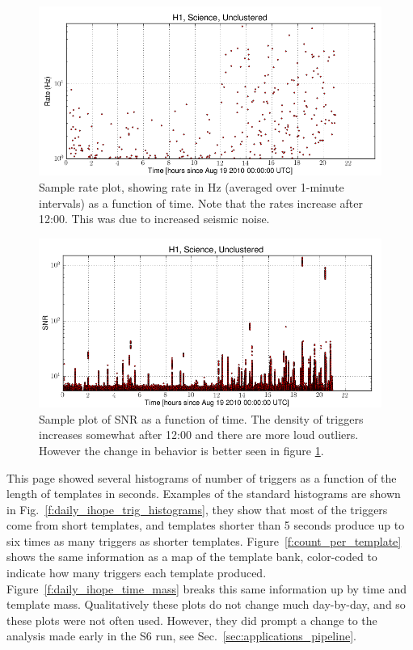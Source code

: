 \begin{figure}
  \includegraphics[width=\linewidth]{figures/detchar/H1_0_UNCLUSTERED_rate_vs_time.png}
  \caption[Daily ihope rate plot]{
  \label{f:daily_ihope_rate_v_time}
Sample rate plot, showing rate in Hz (averaged over
1-minute intervals) as a function of time.  Note that the rates
increase after 12:00.  This was due to increased seismic noise.}
\end{figure}%

\begin{figure}
  \includegraphics[width=\linewidth]{figures/detchar/H1_0_UNCLUSTERED_snr_vs_time.png}
  \caption[Daily ihope SNR plot as a function of time]{
  \label{f:daily_ihope_snr_v_time}
Sample plot of SNR as a function of time.  The density of
triggers increases somewhat after 12:00 and there are more loud
outliers.  However the change in behavior is better seen in 
figure \ref{f:daily_ihope_rate_v_time}.}
\end{figure}%



This page showed several histograms of number of triggers as a
function of the length of templates in seconds.  Examples of the
standard histograms are shown in
Fig.~\ref{f:daily_ihope_trig_histograms}, they show that most of the
triggers come from short templates, and templates shorter than 5
seconds produce up to six times as many triggers as shorter templates.
Figure~\ref{f:count_per_template} shows the same information as a map
of the template bank, color-coded to indicate how many triggers each
template produced.  Figure~\ref{f:daily_ihope_time_mass} breaks this
same information up by time and template mass.
Qualitatively these plots do not change much day-by-day, and so these
plots were not often used.  However, they did prompt a change to
the analysis made early in the S6 run, see
Sec.~\ref{sec:applications_pipeline}.

